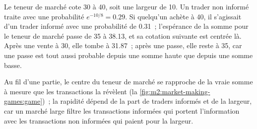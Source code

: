 \begin{omfigure}

\label{fig:m2:market-making-games:dist}
\end{omfigure}

\begin{example}\label{ex:m2:market-making-games:first}
Le teneur de marché cote 30 à 40, soit une largeur de 10. Un trader non informé traite avec une probabilité
$e^{-10/8} = 0.29$. Si quelqu'un achète à 40, il s'agissait d'un trader informé avec une probabilité de 0.31~;
l'espérance de la somme pour le teneur de marché passe de 35 à 38.13, et sa cotation suivante est
centrée là. Après une vente à 30, elle tombe à 31.87~; après une passe, elle reste à 35, car une
passe est tout aussi probable depuis une somme haute que depuis une somme basse.
\end{example}

Au fil d'une partie, le centre du teneur de marché se rapproche de la vraie somme à mesure que les transactions la révèlent
(la \cref{fig:m2:market-making-games:game})~; la rapidité dépend de la part de traders informés
et de la largeur, car un marché large filtre les transactions informées qui portent
l'information avec les transactions non informées qui paient pour la largeur.

